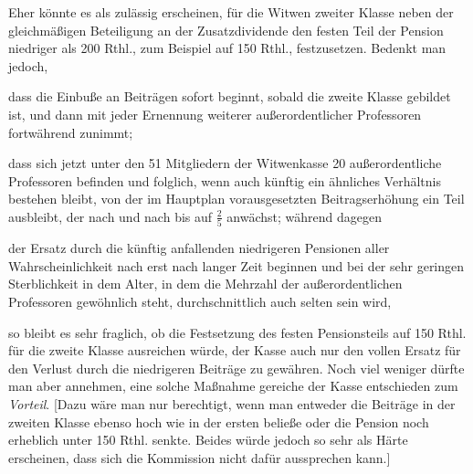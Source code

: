 Eher könnte es als zulässig erscheinen, für die Witwen zweiter Klasse neben der gleichmäßigen Beteiligung an der Zusatzdividende den festen Teil der Pension niedriger als 200 Rthl., zum Beispiel auf 150 Rthl., festzusetzen. Bedenkt man jedoch,

dass die Einbuße an Beiträgen sofort beginnt, sobald die zweite Klasse gebildet ist, und dann mit jeder Ernennung weiterer außerordentlicher Professoren fortwährend zunimmt;

dass sich jetzt unter den 51 Mitgliedern der Witwenkasse 20 außerordentliche Professoren befinden und folglich, wenn auch künftig ein ähnliches Verhältnis bestehen bleibt, von der im Hauptplan vorausgesetzten Beitragserhöhung ein Teil ausbleibt, der nach und nach bis auf \(\tfrac{2}{5}\) anwächst; während dagegen

der Ersatz durch die künftig anfallenden niedrigeren Pensionen aller Wahrscheinlichkeit nach erst nach langer Zeit beginnen und bei der sehr geringen Sterblichkeit in dem Alter, in dem die Mehrzahl der außerordentlichen Professoren gewöhnlich steht, durchschnittlich auch selten sein wird,

so bleibt es sehr fraglich, ob die Festsetzung des festen Pensionsteils auf 150 Rthl. für die zweite Klasse ausreichen würde, der Kasse auch nur den vollen Ersatz für den Verlust durch die niedrigeren Beiträge zu gewähren. Noch viel weniger dürfte man aber annehmen, eine solche Maßnahme gereiche der Kasse entschieden zum \textit{Vorteil}. [Dazu wäre man nur berechtigt, wenn man entweder die Beiträge in der zweiten Klasse ebenso hoch wie in der ersten beließe oder die Pension noch erheblich unter 150 Rthl. senkte. Beides würde jedoch so sehr als Härte erscheinen, dass sich die Kommission nicht dafür aussprechen kann.]

